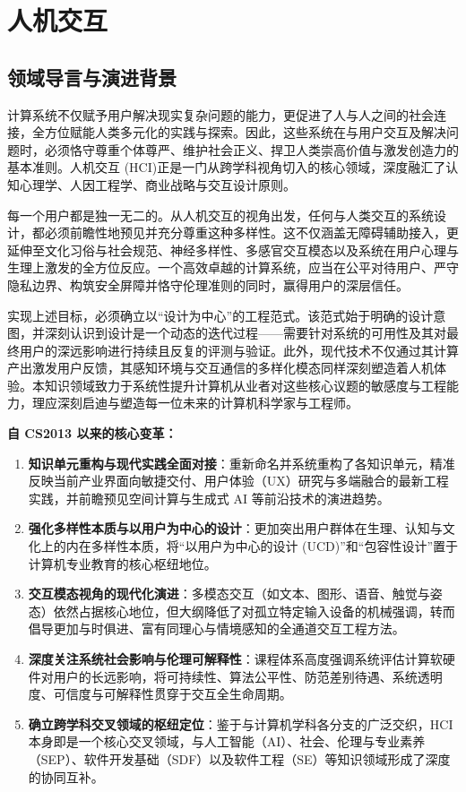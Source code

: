 \chapter{人机交互}

\section{领域导言与演进背景}

\begin{preamblebox}[知识领域概述与变革]
计算系统不仅赋予用户解决现实复杂问题的能力，更促进了人与人之间的社会连接，全方位赋能人类多元化的实践与探索。因此，这些系统在与用户交互及解决问题时，必须恪守尊重个体尊严、维护社会正义、捍卫人类崇高价值与激发创造力的基本准则。人机交互 (HCI)正是一门从跨学科视角切入的核心领域，深度融汇了认知心理学、人因工程学、商业战略与交互设计原则。

每一个用户都是独一无二的。从人机交互的视角出发，任何与人类交互的系统设计，都必须前瞻性地预见并充分尊重这种多样性。这不仅涵盖无障碍辅助接入，更延伸至文化习俗与社会规范、神经多样性、多感官交互模态以及系统在用户心理与生理上激发的全方位反应。一个高效卓越的计算系统，应当在公平对待用户、严守隐私边界、构筑安全屏障并恪守伦理准则的同时，赢得用户的深层信任。

实现上述目标，必须确立以“设计为中心”的工程范式。该范式始于明确的设计意图，并深刻认识到设计是一个动态的迭代过程——需要针对系统的可用性及其对最终用户的深远影响进行持续且反复的评测与验证。此外，现代技术不仅通过其计算产出激发用户反馈，其感知环境与交互通信的多样化模态同样深刻塑造着人机体验。本知识领域致力于系统性提升计算机从业者对这些核心议题的敏感度与工程能力，理应深刻启迪与塑造每一位未来的计算机科学家与工程师。

\textbf{自 CS2013 以来的核心变革：}
\begin{enumerate}
    \item \textbf{知识单元重构与现代实践全面对接}：重新命名并系统重构了各知识单元，精准反映当前产业界面向敏捷交付、用户体验（UX）研究与多端融合的最新工程实践，并前瞻预见空间计算与生成式 AI 等前沿技术的演进趋势。
    \item \textbf{强化多样性本质与以用户为中心的设计}：更加突出用户群体在生理、认知与文化上的内在多样性本质，将“以用户为中心的设计 (UCD)”和“包容性设计”置于计算机专业教育的核心枢纽地位。
    \item \textbf{交互模态视角的现代化演进}：多模态交互（如文本、图形、语音、触觉与姿态）依然占据核心地位，但大纲降低了对孤立特定输入设备的机械强调，转而倡导更加与时俱进、富有同理心与情境感知的全通道交互工程方法。
    \item \textbf{深度关注系统社会影响与伦理可解释性}：课程体系高度强调系统评估计算软硬件对用户的长远影响，将可持续性、算法公平性、防范差别待遇、系统透明度、可信度与可解释性贯穿于交互全生命周期。
    \item \textbf{确立跨学科交叉领域的枢纽定位}：鉴于与计算机学科各分支的广泛交织，HCI 本身即是一个核心交叉领域，与人工智能（AI）、社会、伦理与专业素养（SEP）、软件开发基础（SDF）以及软件工程（SE）等知识领域形成了深度的协同互补。
\end{enumerate}
\end{preamblebox}

